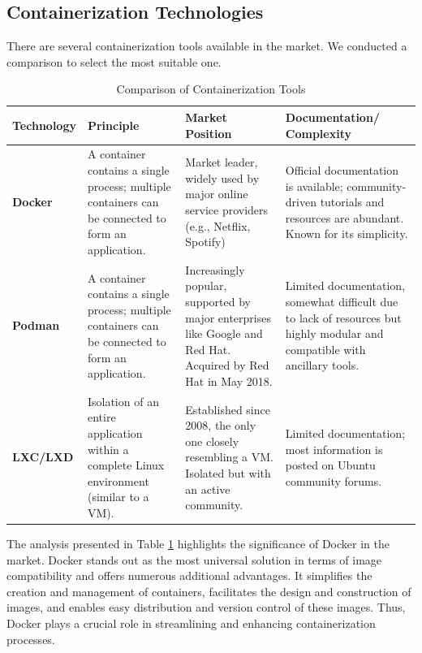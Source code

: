 \subsection{Containerization Technologies}
There are several containerization tools available in the market. We conducted a comparison to select the most suitable one.

\begin{table}[h]
    \centering
    \begin{tabular}{|p{4cm}|p{4cm}|p{4cm}|p{4cm}|}
        \hline
        \textbf{Technology} & \textbf{Principle} & \textbf{Market Position} & \textbf{Documentation/ Complexity} \\
        \hline
        \textbf{Docker} & A container contains a single process; multiple containers can be connected to form an application. & Market leader, widely used by major online service providers (e.g., Netflix, Spotify) & Official documentation is available; community-driven tutorials and resources are abundant. Known for its simplicity.\\
        \hline
        \textbf{Podman} & A container contains a single process; multiple containers can be connected to form an application. & Increasingly popular, supported by major enterprises like Google and Red Hat. Acquired by Red Hat in May 2018. & Limited documentation, somewhat difficult due to lack of resources but highly modular and compatible with ancillary tools.\\
        \hline
        \textbf{LXC/LXD} & Isolation of an entire application within a complete Linux environment (similar to a VM). & Established since 2008, the only one closely resembling a VM. Isolated but with an active community. & Limited documentation; most information is posted on Ubuntu community forums. \\
        \hline
    \end{tabular}
    \caption{Comparison of Containerization Tools}
    \label{tab:container_tools_comparison}
\end{table}

The analysis presented in Table \ref{tab:container_tools_comparison} highlights the significance of Docker in the market. Docker stands out as the most universal solution in terms of image compatibility and offers numerous additional advantages. It simplifies the creation and management of containers, facilitates the design and construction of images, and enables easy distribution and version control of these images. Thus, Docker plays a crucial role in streamlining and enhancing containerization processes.


